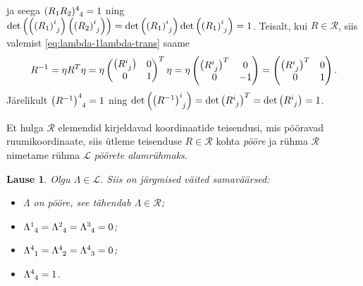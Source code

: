 \documentclass[12pt,a4paper,oneside]{article}
\theoremstyle{plain}
\newtheorem{lause}{Lause}[section]
\theoremstyle{definition}
\numberwithin{equation}{section}
\def\L{{\mathcal L}}
\begin{document}
ja seega $(R_1 R_2)\indices{^4_4} = 1$ ning 
$\det \left(\left(\left(R_1\right)\indices{^i_j}\right) 
\left(\left(R_2\right)\indices{^i_j}\right) \right) = 
\det \left(\left(R_1\right)\indices{^i_j}\right) \det 
\left(\left(R_1\right)\indices{^i_j}\right) = 1$.
Teisalt, kui $R \in \mathcal{R}$, siis valemist 
\ref{eq:lambda-1lambda-trans} saame
\begin{align*}
R^{-1} = \eta R^T \eta = \eta \begin{pmatrix}
\left(R\indices{^i_j}\right) & 0 \\ 
0 & 1 \\ \end{pmatrix}^T \eta = 
\eta \begin{pmatrix}
\left(R\indices{^i_j}\right)^T & 0 \\ 
0 & -1 \\ \end{pmatrix} = \begin{pmatrix}
\left(R\indices{^i_j}\right)^T & 0 \\ 
0 & 1 \\ \end{pmatrix}.
\end{align*}
Järelikult $\left(R^{-1}\right)\indices{^4_4} = 1$ ning 
$\det \left(\left(R^{-1}\right)\indices{^i_j}\right) = 
\det \left(R\indices{^i_j}\right)^T = \det 
\left(R\indices{^i_j}\right) = 1$.

Et hulga $\mathcal{R}$ elemendid kirjeldavad koordinaatide 
teisendusi, mis pööravad ruumikoordinaate, siis ütleme teisenduse 
$R \in \mathcal{R}$ kohta \emph{pööre} ja rühma $\mathcal{R}$ 
nimetame rühma $\L$ \emph{pöörete alamrühmaks}.

\begin{lause} \label{lause:rotation}
Olgu $\Lambda \in \L$. Siis on järgmised väited samaväärsed:
\begin{itemize}
\item[$(i)$] $\Lambda$ on pööre, see tähendab $\Lambda \in 
\mathcal{R}$;
\item[$(ii)$] $\Lambda\indices{^1_4} = \Lambda\indices{^2_4} = 
\Lambda\indices{^3_4} = 0$;
\item[$(iii)$] $\Lambda\indices{^4_1} = \Lambda\indices{^4_2} = 
\Lambda\indices{^4_3} = 0$;
\item[$(iv)$] $\Lambda\indices{^4_4} = 1$.
\end{itemize}
\end{lause}
\end{document}
